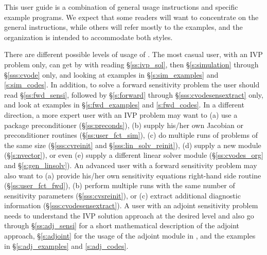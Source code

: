 This user guide is a combination of general usage instructions and
specific example programs.  We expect that some readers will want to
concentrate on the general instructions, while others will refer
mostly to the examples, and the organization is intended to
accommodate both styles.

There are different possible levels of usage of {\cvodes}. The most casual
user, with an IVP problem only, can get by with reading \S\ref{ss:ivp_sol}, 
then \S\ref{s:simulation} through \S\ref{sss:cvode} only, and looking at examples 
in \S\ref{s:sim_examples} and \A\ref{s:sim_codes}. 
In addition, to solve a forward sensitivity problem the user should read 
\S\ref{ss:fwd_sensi}, followed by \S\ref{s:forward} through 
\S\ref{sss:cvodesensextract} only, and look at examples in 
\S\ref{s:fwd_examples} and \A\ref{s:fwd_codes}. 
In a different direction, a more expert user with an IVP problem may want
to (a) use a package preconditioner (\S\ref{ss:preconds}), (b) supply
his/her own Jacobian or preconditioner routines (\S\ref{ss:user_fct_sim}),
(c) do multiple runs of problems of the same size (\S\ref{sss:cvreinit} and
\S\ref{sss:lin_solv_reinit}), (d) supply a new {\nvector} module
(\S\ref{s:nvector}), or even (e) supply a different linear solver module
(\S\ref{ss:cvodes_org} and \S\ref{s:gen_linsolv}).
An advanced user with a forward sensitivity problem may also want to
(a) provide his/her own sensitivity equations right-hand side routine
(\S\ref{ss:user_fct_fwd}), (b) perform multiple runs with the same number of
sensitivity parameters (\S\ref{sss:cvsreinit}), or (c) extract additional
diagnostic information (\S\ref{sss:cvodesensextract}).
A user with an adjoint sensitivity problem needs to understand the IVP 
solution approach at the desired level and also go through 
\S\ref{ss:adj_sensi} for a short mathematical description of the adjoint
approach, \S\ref{s:adjoint} for the usage of the adjoint module in {\cvodes},
and the examples in \S\ref{s:adj_examples} and \A\ref{s:adj_codes}.


